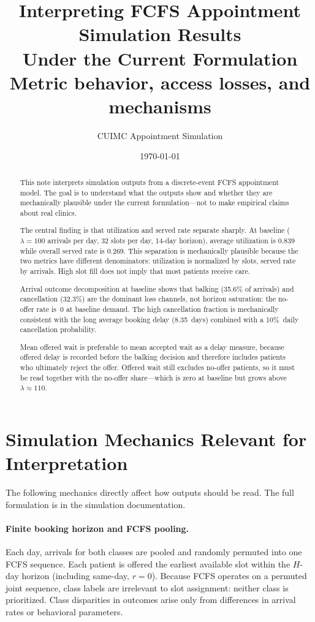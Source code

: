 \documentclass[11pt]{article}
\title{Interpreting FCFS Appointment Simulation Results\\
Under the Current Formulation\\[0.4em]
\large Metric behavior, access losses, and mechanisms}
\author{CUIMC Appointment Simulation}
\date{\today}
\begin{document}
\maketitle

\begin{abstract}
\noindent
This note interprets simulation outputs from a discrete-event FCFS appointment
model. The goal is to understand what the outputs show and whether they are
mechanically plausible under the current formulation---not to make empirical
claims about real clinics.

The central finding is that utilization and served rate separate sharply.
At baseline ($\lambda = 100$ arrivals per day, 32 slots per day, 14-day
horizon), average utilization is 0.839 while overall served rate is 0.269.
This separation is mechanically plausible because the two metrics have
different denominators: utilization is normalized by slots, served rate by
arrivals. High slot fill does not imply that most patients receive care.

Arrival outcome decomposition at baseline shows that balking (35.6\% of
arrivals) and cancellation (32.3\%) are the dominant loss channels, not
horizon saturation: the no-offer rate is~0 at baseline demand. The high
cancellation fraction is mechanically consistent with the long average
booking delay (8.35~days) combined with a 10\%~daily cancellation
probability.

Mean offered wait is preferable to mean accepted wait as a delay measure,
because offered delay is recorded before the balking decision and therefore
includes patients who ultimately reject the offer. Offered wait still excludes
no-offer patients, so it must be read together with the no-offer share---which
is zero at baseline but grows above $\lambda \approx 110$.
\end{abstract}

\tableofcontents
\newpage

\section{Simulation Mechanics Relevant for Interpretation}
\label{sec:mechanics}

The following mechanics directly affect how outputs should be read. The full
formulation is in the simulation documentation.

\paragraph{Finite booking horizon and FCFS pooling.}
Each day, arrivals for both classes are pooled and randomly permuted into one
FCFS sequence. Each patient is offered the earliest available slot within the
$H$-day horizon (including same-day, $r=0$). Because FCFS operates on a
permuted joint sequence, class labels are irrelevant to slot assignment:
neither class is prioritized. Class disparities in outcomes arise only from
differences in arrival rates or behavioral parameters.
\end{document}

